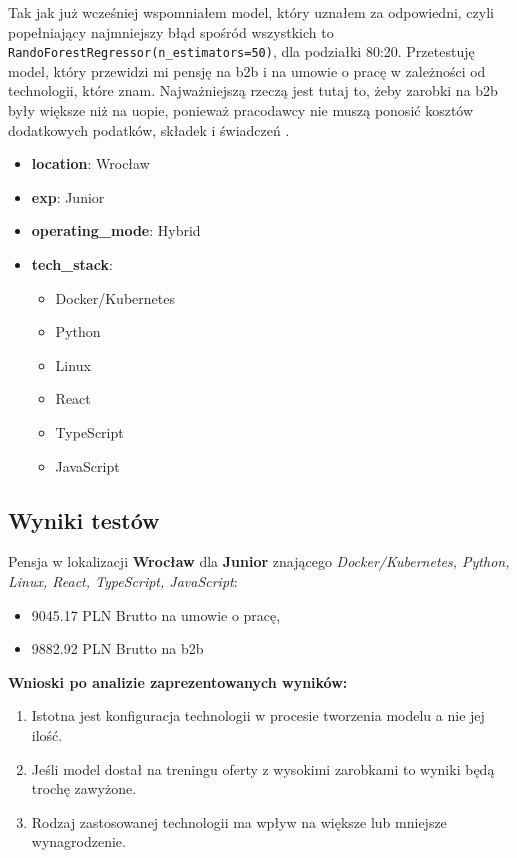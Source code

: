 \documentclass[a4paper]{article}
\begin{document}
\quad Tak jak już wcześniej wspomniałem model, który uznałem za odpowiedni, czyli popełniający najmniejszy błąd
spośród wszystkich to \texttt{RandoForestRegressor(n\_estimators=50)}, dla podziałki 80:20.
Przetestuję model, który przewidzi mi pensję na b2b i na umowie o pracę w zależności od technologii, które znam. Najważniejszą rzeczą jest tutaj to, żeby zarobki na b2b były większe niż na uopie,
ponieważ pracodawcy nie muszą ponosić kosztów dodatkowych podatków, składek i świadczeń \cite{uop_vs_b2b}.

\begin{itemize}
    \item \textbf{location}: Wrocław
    \item \textbf{exp}: Junior
    \item \textbf{operating\_mode}: Hybrid
    \item \textbf{tech\_stack}:
          \begin{itemize}
              \item Docker/Kubernetes
              \item Python
              \item Linux
              \item React
              \item TypeScript
              \item JavaScript
          \end{itemize}
\end{itemize}

\subsection{Wyniki testów}

\quad Pensja w lokalizacji \textbf{Wrocław} dla \textbf{Junior} znającego \textit{Docker/Kubernetes, Python, Linux, React, TypeScript, JavaScript}:

\begin{itemize}
    \item 9045.17 PLN Brutto na umowie o pracę,
    \item 9882.92 PLN Brutto na b2b
\end{itemize}

\textbf{Wnioski po analizie zaprezentowanych wyników:}

\begin{enumerate}
    \item Istotna jest konfiguracja technologii w procesie tworzenia modelu a nie jej ilość.
    \item Jeśli model dostał na treningu oferty z wysokimi zarobkami to wyniki będą trochę zawyżone.
    \item Rodzaj zastosowanej technologii ma wpływ na większe lub mniejsze wynagrodzenie.
\end{enumerate}
\end{document}
